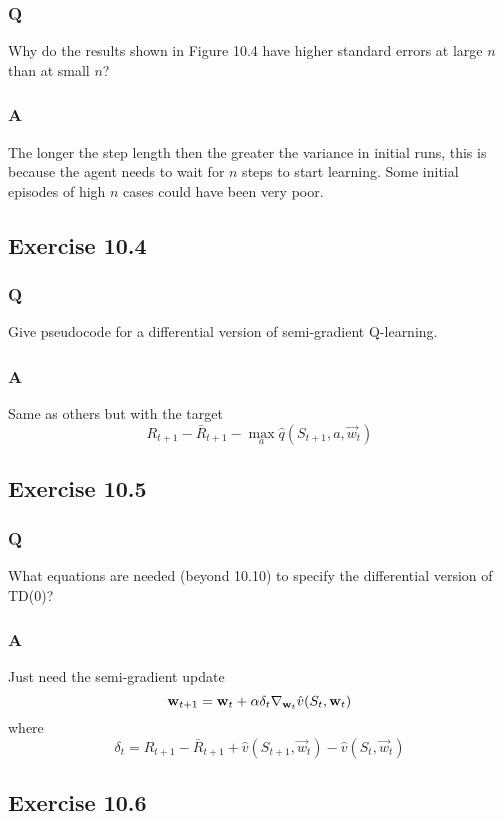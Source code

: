\subsubsection{Q}
Why do the results shown in Figure 10.4 have higher standard errors at large $n$ than at small $n$?
\subsubsection{A}
The longer the step length then the greater the variance in initial runs, this is because the agent needs to wait for $n$ steps to start learning. Some initial episodes of high $n$ cases could have been very poor.

\subsection{Exercise 10.4}
\subsubsection{Q}
Give pseudocode for a differential version of semi-gradient Q-learning.

\subsubsection{A}
Same as others but with the target
\[
    R_{t+1} - \bar{R}_{t+1} - \max_a \hat{q}(S_{t+1}, a, \vec{w}_t)
\]

\subsection{Exercise 10.5}
\subsubsection{Q}
What equations are needed (beyond 10.10) to specify the differential version of TD(0)?

\subsubsection{A}
Just need the semi-gradient update
\[
    \mathbf{w}_{t+1} = \mathbf{w}_{t} + \alpha \delta_t \nabla_{\mathbf{w}_t} \hat{v}(S_t, \mathbf{w}_t)
\]
where
\[
    \delta_t = R_{t+1} - \bar{R}_{t+1} + \hat{v}(S_{t+1}, \vec{w}_{t}) - \hat{v}(S_{t}, \vec{w}_t)
\]

\subsection{Exercise 10.6}
